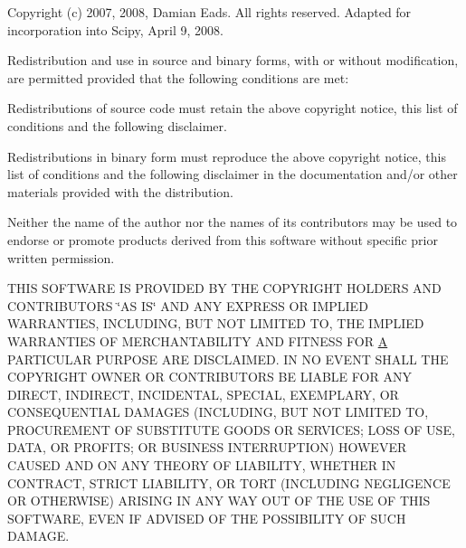Copyright (c) 2007, 2008, Damian Eads. All rights reserved. Adapted for incorporation into Scipy, April 9, 2008.

Redistribution and use in source and binary forms, with or without modification, are permitted provided that the following conditions are met\+:
\begin{DoxyItemize}
\item Redistributions of source code must retain the above copyright notice, this list of conditions and the following disclaimer.
\item Redistributions in binary form must reproduce the above copyright notice, this list of conditions and the following disclaimer in the documentation and/or other materials provided with the distribution.
\item Neither the name of the author nor the names of its contributors may be used to endorse or promote products derived from this software without specific prior written permission.
\end{DoxyItemize}

T\+H\+I\+S S\+O\+F\+T\+W\+A\+R\+E I\+S P\+R\+O\+V\+I\+D\+E\+D B\+Y T\+H\+E C\+O\+P\+Y\+R\+I\+G\+H\+T H\+O\+L\+D\+E\+R\+S A\+N\+D C\+O\+N\+T\+R\+I\+B\+U\+T\+O\+R\+S \char`\"{}\+A\+S I\+S\char`\"{} A\+N\+D A\+N\+Y E\+X\+P\+R\+E\+S\+S O\+R I\+M\+P\+L\+I\+E\+D W\+A\+R\+R\+A\+N\+T\+I\+E\+S, I\+N\+C\+L\+U\+D\+I\+N\+G, B\+U\+T N\+O\+T L\+I\+M\+I\+T\+E\+D T\+O, T\+H\+E I\+M\+P\+L\+I\+E\+D W\+A\+R\+R\+A\+N\+T\+I\+E\+S O\+F M\+E\+R\+C\+H\+A\+N\+T\+A\+B\+I\+L\+I\+T\+Y A\+N\+D F\+I\+T\+N\+E\+S\+S F\+O\+R \hyperlink{classA}{A} P\+A\+R\+T\+I\+C\+U\+L\+A\+R P\+U\+R\+P\+O\+S\+E A\+R\+E D\+I\+S\+C\+L\+A\+I\+M\+E\+D. I\+N N\+O E\+V\+E\+N\+T S\+H\+A\+L\+L T\+H\+E C\+O\+P\+Y\+R\+I\+G\+H\+T O\+W\+N\+E\+R O\+R C\+O\+N\+T\+R\+I\+B\+U\+T\+O\+R\+S B\+E L\+I\+A\+B\+L\+E F\+O\+R A\+N\+Y D\+I\+R\+E\+C\+T, I\+N\+D\+I\+R\+E\+C\+T, I\+N\+C\+I\+D\+E\+N\+T\+A\+L, S\+P\+E\+C\+I\+A\+L, E\+X\+E\+M\+P\+L\+A\+R\+Y, O\+R C\+O\+N\+S\+E\+Q\+U\+E\+N\+T\+I\+A\+L D\+A\+M\+A\+G\+E\+S (I\+N\+C\+L\+U\+D\+I\+N\+G, B\+U\+T N\+O\+T L\+I\+M\+I\+T\+E\+D T\+O, P\+R\+O\+C\+U\+R\+E\+M\+E\+N\+T O\+F S\+U\+B\+S\+T\+I\+T\+U\+T\+E G\+O\+O\+D\+S O\+R S\+E\+R\+V\+I\+C\+E\+S; L\+O\+S\+S O\+F U\+S\+E, D\+A\+T\+A, O\+R P\+R\+O\+F\+I\+T\+S; O\+R B\+U\+S\+I\+N\+E\+S\+S I\+N\+T\+E\+R\+R\+U\+P\+T\+I\+O\+N) H\+O\+W\+E\+V\+E\+R C\+A\+U\+S\+E\+D A\+N\+D O\+N A\+N\+Y T\+H\+E\+O\+R\+Y O\+F L\+I\+A\+B\+I\+L\+I\+T\+Y, W\+H\+E\+T\+H\+E\+R I\+N C\+O\+N\+T\+R\+A\+C\+T, S\+T\+R\+I\+C\+T L\+I\+A\+B\+I\+L\+I\+T\+Y, O\+R T\+O\+R\+T (I\+N\+C\+L\+U\+D\+I\+N\+G N\+E\+G\+L\+I\+G\+E\+N\+C\+E O\+R O\+T\+H\+E\+R\+W\+I\+S\+E) A\+R\+I\+S\+I\+N\+G I\+N A\+N\+Y W\+A\+Y O\+U\+T O\+F T\+H\+E U\+S\+E O\+F T\+H\+I\+S S\+O\+F\+T\+W\+A\+R\+E, E\+V\+E\+N I\+F A\+D\+V\+I\+S\+E\+D O\+F T\+H\+E P\+O\+S\+S\+I\+B\+I\+L\+I\+T\+Y O\+F S\+U\+C\+H D\+A\+M\+A\+G\+E. \hypertarget{scipy-0_814_80_2scipy_2spatial_2src_2common_8h_a854cb1cc38fe7c993ba776d0abf73c0a}{}
